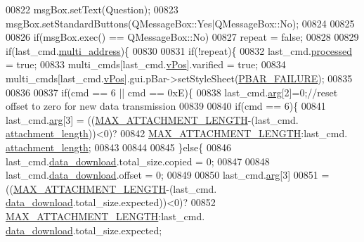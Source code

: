 \begin{DoxyCode}
{{{{{{{{{{{{{{{{{{{{00822     msgBox.setText(Question);
00823     msgBox.setStandardButtons(QMessageBox::Yes|QMessageBox::No);
00824 
00825 
00826     \textcolor{keywordflow}{if}(msgBox.exec() == QMessageBox::No)
00827              repeat = \textcolor{keyword}{false};
00828 
00829         \textcolor{keywordflow}{if}(last\_cmd.\hyperlink{a00004_a8e69b971c61ced27a7567efd2bf0db59}{multi\_address})\{
00830 
00831             \textcolor{keywordflow}{if}(!repeat)\{
00832             last\_cmd.\hyperlink{a00004_a3e88f779da9798a5da7dda227e2ca388}{processed} = \textcolor{keyword}{true};
00833             multi\_cmds[last\_cmd.\hyperlink{a00004_a2b48b371fd84be2a8ad581b1ad708b88}{vPos}].varified = \textcolor{keyword}{true};
00834             multi\_cmds[last\_cmd.\hyperlink{a00004_a2b48b371fd84be2a8ad581b1ad708b88}{vPos}].gui.pBar->setStyleSheet(\hyperlink{a00090_aa9f43b2774395af6510910f8feed7cb4}{PBAR\_FAILURE});
00835             
00836             
00837             \textcolor{keywordflow}{if}(cmd == 6 || cmd == 0xE)\{
00838             last\_cmd.\hyperlink{a00004_a56e6c2d7315d0ae60a51e8b140c9cfe4}{arg}[2]=0;\textcolor{comment}{//reset offset to zero for new data transmission}
00839               
00840             \textcolor{keywordflow}{if}(cmd == 6)\{
00841             last\_cmd.\hyperlink{a00004_a56e6c2d7315d0ae60a51e8b140c9cfe4}{arg}[3] = ((\hyperlink{a00086_aa8abe3a822c64813f7aaba3ca7e3db9c}{MAX\_ATTACHMENT\_LENGTH}-(last\_cmd.
      \hyperlink{a00004_ae5afad7c81dab7d9ab6587251aafdbf4}{attachment\_length}))<0)?
00842                               \hyperlink{a00086_aa8abe3a822c64813f7aaba3ca7e3db9c}{MAX\_ATTACHMENT\_LENGTH}:last\_cmd.
      \hyperlink{a00004_ae5afad7c81dab7d9ab6587251aafdbf4}{attachment\_length};
00843 
00844                 
00845             \}\textcolor{keywordflow}{else}\{
00846             last\_cmd.\hyperlink{a00004_a5cfeaed4d4f8e51070a324c0ba893ebe}{data\_download}.total\_size.copied     = 0;
00847             
00848             last\_cmd.\hyperlink{a00004_a5cfeaed4d4f8e51070a324c0ba893ebe}{data\_download}.offset   = 0;
00849             
00850             last\_cmd.\hyperlink{a00004_a56e6c2d7315d0ae60a51e8b140c9cfe4}{arg}[3]              
00851                     = ((\hyperlink{a00086_aa8abe3a822c64813f7aaba3ca7e3db9c}{MAX\_ATTACHMENT\_LENGTH}-(last\_cmd.
      \hyperlink{a00004_a5cfeaed4d4f8e51070a324c0ba893ebe}{data\_download}.total\_size.expected))<0)?
00852                         \hyperlink{a00086_aa8abe3a822c64813f7aaba3ca7e3db9c}{MAX\_ATTACHMENT\_LENGTH}:last\_cmd.
      \hyperlink{a00004_a5cfeaed4d4f8e51070a324c0ba893ebe}{data\_download}.total\_size.expected;
}}}}}}}}}}}}}}}}}}}}
\end{DoxyCode}
